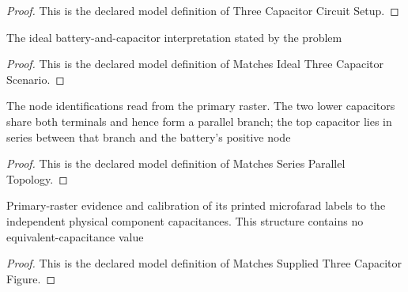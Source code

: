 \begin{proof}
  This is the declared model definition of Three Capacitor Circuit Setup.
\end{proof}
\begin{definition}
  \label{def:physics:phyx-mini-0877:phyxminiproblems-problemphyxmini0877-matchesidealthreecapacitorscenario}
  The ideal battery-and-capacitor interpretation stated by the problem
\end{definition}
\begin{proof}
  This is the declared model definition of Matches Ideal Three Capacitor Scenario.
\end{proof}
\begin{definition}
  \label{def:physics:phyx-mini-0877:phyxminiproblems-problemphyxmini0877-matchesseriesparalleltopology}
  The node identifications read from the primary raster. The two lower capacitors share both terminals and hence form a parallel branch; the top capacitor lies in series between that branch and the battery's positive node
\end{definition}
\begin{proof}
  This is the declared model definition of Matches Series Parallel Topology.
\end{proof}
\begin{definition}
  \label{def:physics:phyx-mini-0877:phyxminiproblems-problemphyxmini0877-matchessuppliedthreecapacitorfigure}
  Primary-raster evidence and calibration of its printed microfarad labels to the independent physical component capacitances. This structure contains no equivalent-capacitance value
\end{definition}
\begin{proof}
  This is the declared model definition of Matches Supplied Three Capacitor Figure.
\end{proof}
